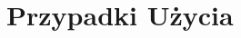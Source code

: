 \documentclass[../Dokumentacja.tex]{subfiles}
\begin{document}
\section{Przypadki Użycia}


\end{document}
